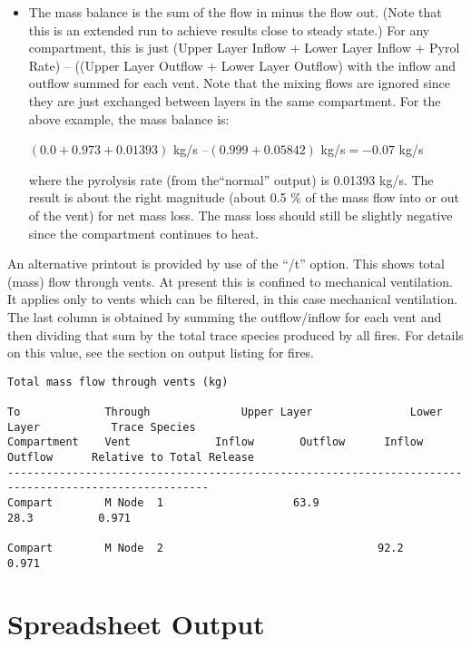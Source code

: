\begin{itemize}
\item The mass balance is the sum of the flow in minus the flow out. (Note that this is an extended run to achieve results close to steady state.) For any compartment, this is just (Upper Layer Inflow + Lower Layer Inflow + Pyrol Rate) – ((Upper Layer Outflow + Lower Layer Outflow) with the inflow and outflow summed for each vent. Note that the mixing flows are ignored since they are just exchanged between layers in the same compartment. For the above example, the mass balance is:

$(0.0 + 0.973 + 0.01393 )$ kg/s $– (0.999 + 0.05842)$ kg/s$ = -0.07$ kg/s

where the pyrolysis rate (from the``normal'' output) is 0.01393 kg/s. The result is about the right magnitude (about 0.5 \% of the mass flow into or out of the vent) for net mass loss.  The mass loss should still be slightly negative since the compartment continues to heat.
\end{itemize}

An alternative printout is provided by use of the ``/t'' option. This shows total (mass) flow through vents. At present this is confined to mechanical ventilation. It applies only to vents which can be filtered, in this case mechanical ventilation. The last column is obtained by summing the outflow/inflow for each vent and then dividing that sum by the total trace species produced by all fires. For details on this value, see the section on output listing for fires.

\begin{lstlisting}[basicstyle=\tiny]
Total mass flow through vents (kg)

To             Through              Upper Layer               Lower Layer           Trace Species
Compartment    Vent             Inflow       Outflow      Inflow       Outflow      Relative to Total Release
-----------------------------------------------------------------------------------------------------
Compart        M Node  1                    63.9                      28.3          0.971                             

Compart        M Node  2                                 92.2                       0.971
\end{lstlisting}

\section{Spreadsheet Output}

